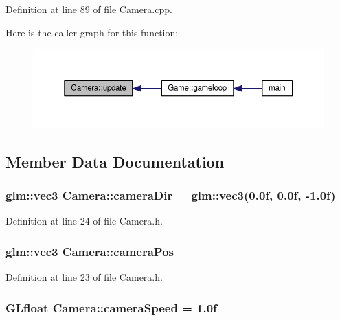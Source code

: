 Definition at line 89 of file Camera.\+cpp.



Here is the caller graph for this function\+:\nopagebreak
\begin{figure}[H]
\begin{center}
\leavevmode
\includegraphics[width=350pt]{class_camera_a42cda7239981a5618660d04bd5893556_icgraph}
\end{center}
\end{figure}




\subsection{Member Data Documentation}
\hypertarget{class_camera_ad641b25d477900ac4f3cd859ac14e8f7}{}
\subsubsection[{camera\+Dir}]{\setlength{\rightskip}{0pt plus 5cm}glm\+::vec3 Camera\+::camera\+Dir = glm\+::vec3(0.\+0f, 0.\+0f, -\/1.\+0f)}\label{class_camera_ad641b25d477900ac4f3cd859ac14e8f7}


Definition at line 24 of file Camera.\+h.

\hypertarget{class_camera_a424bcf971a87506ba6770f2c5c1073f0}{}
\subsubsection[{camera\+Pos}]{\setlength{\rightskip}{0pt plus 5cm}glm\+::vec3 Camera\+::camera\+Pos}\label{class_camera_a424bcf971a87506ba6770f2c5c1073f0}


Definition at line 23 of file Camera.\+h.

\hypertarget{class_camera_a8f67cd3183810d8d675d38cc62af966a}{}
\subsubsection[{camera\+Speed}]{\setlength{\rightskip}{0pt plus 5cm}G\+Lfloat Camera\+::camera\+Speed = 1.\+0f}\label{class_camera_a8f67cd3183810d8d675d38cc62af966a}


